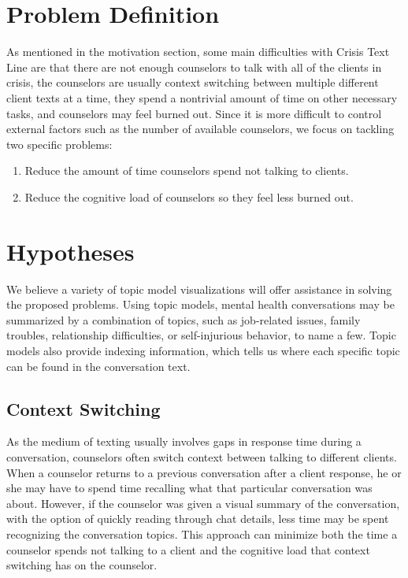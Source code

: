 \section{Problem Definition}

As mentioned in the motivation section, some main difficulties with Crisis Text Line
are that there are not enough counselors to talk with all of the clients in crisis, the
counselors are usually context switching between multiple different client texts at a
time, they spend a nontrivial amount of time on other necessary tasks, and
counselors may feel burned out. Since it is
more difficult to control external factors such as the number of available counselors,
we focus on tackling two specific problems:
\begin{enumerate}
  \item Reduce the amount of time counselors spend not talking to clients.
  \item Reduce the cognitive load of counselors so they feel less burned out.
\end{enumerate}

\section{Hypotheses}

We believe a variety of topic model visualizations will offer assistance in solving the
proposed problems. Using topic models, mental health conversations may be
summarized by a combination of topics, such as job-related issues, family troubles,
relationship difficulties, or self-injurious behavior, to name a few. Topic models also
provide indexing information, which tells us where each specific topic can be found
in the conversation text.

\subsection{Context Switching}

As the medium of texting usually involves gaps in response time during a
conversation, counselors often switch context between talking to different clients.
When a counselor returns to a previous conversation after a client response,
he or she may have to spend time recalling what that particular conversation was
about. However, if the counselor was given a visual summary of the conversation,
with the option of quickly reading through chat details, less time may be spent
recognizing the conversation topics. This approach can minimize both the time
a counselor spends not talking to a client and the cognitive load that context
switching has on the counselor.

